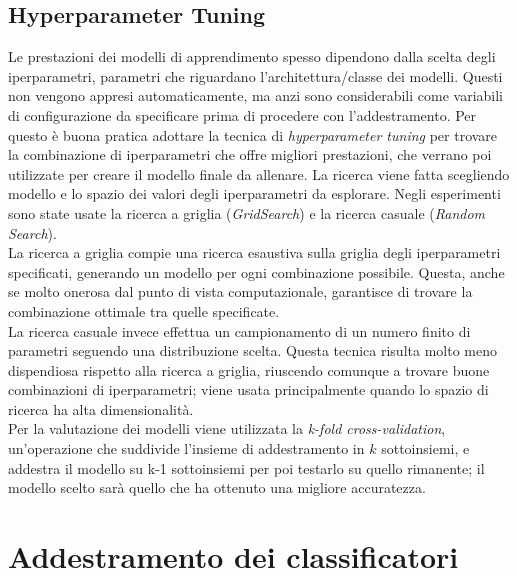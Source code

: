 \subsection{Hyperparameter Tuning}\label{subsec:tuning}
Le prestazioni dei modelli di apprendimento spesso dipendono dalla scelta degli iperparametri, parametri che riguardano l'architettura/classe dei modelli. Questi non vengono appresi automaticamente, ma anzi sono considerabili come variabili di configurazione da specificare prima di procedere con l'addestramento. Per questo è buona pratica adottare la tecnica di \textit{hyperparameter tuning} per trovare la combinazione di iperparametri che offre migliori prestazioni, che verrano poi utilizzate per creare il modello finale da allenare.
La ricerca viene fatta scegliendo modello e lo spazio dei valori degli iperparametri da esplorare. Negli esperimenti sono state usate la ricerca a griglia (\textit{GridSearch}) e la ricerca casuale (\textit{Random Search}).\\
La ricerca a griglia compie una ricerca esaustiva sulla griglia degli iperparametri specificati, generando un modello per ogni combinazione possibile. Questa, anche se molto onerosa dal punto di vista computazionale, garantisce di trovare la combinazione ottimale tra quelle specificate.\\
La ricerca casuale invece effettua un campionamento di un numero finito di parametri seguendo una distribuzione scelta. Questa tecnica risulta molto meno dispendiosa rispetto alla ricerca a griglia, riuscendo comunque a trovare buone combinazioni di iperparametri; viene usata principalmente quando lo spazio di ricerca ha alta dimensionalità.\\
Per la valutazione dei modelli viene utilizzata la \textit{k-fold cross-validation}, un'operazione che suddivide l'insieme di addestramento in $k$ sottoinsiemi, e addestra il modello su k-1 sottoinsiemi per poi testarlo su quello rimanente; il modello scelto sarà quello che ha ottenuto una migliore accuratezza.
\section{Addestramento dei classificatori}
